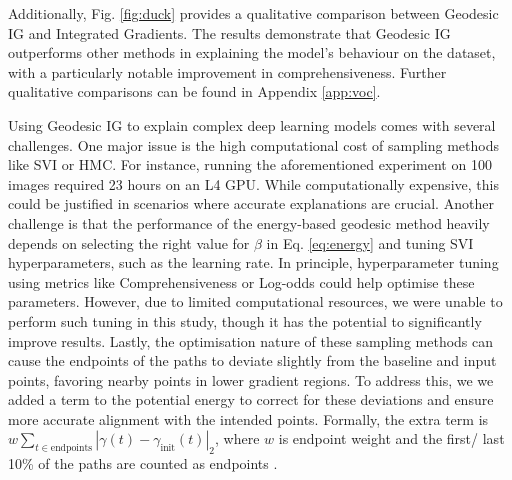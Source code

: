 Additionally, Fig. \ref{fig:duck} provides a qualitative comparison between Geodesic IG and Integrated Gradients. The results demonstrate that Geodesic IG outperforms other methods in explaining the model's behaviour on the dataset, with a particularly notable improvement in comprehensiveness. Further qualitative comparisons can be found in Appendix \ref{app:voc}.

Using Geodesic IG to explain complex deep learning models comes with several challenges. One major issue is the high computational cost of sampling methods like SVI or HMC. For instance, running the aforementioned experiment on 100 images required 23 hours on an L4 GPU. While computationally expensive, this could be justified in scenarios where accurate explanations are crucial. Another challenge is that the performance of the energy-based geodesic method heavily depends on selecting the right value for $\beta$ in Eq. \ref{eq:energy} and tuning SVI hyperparameters, such as the learning rate. In principle, hyperparameter tuning using metrics like Comprehensiveness or Log-odds could help optimise these parameters. However, due to limited computational resources, we were unable to perform such tuning in this study, though it has the potential to significantly improve results. Lastly, the optimisation nature of these sampling methods can cause the endpoints of the paths to deviate slightly from the baseline and input points, favoring nearby points in lower gradient regions. To address this, we we added a term to the potential energy to correct for these deviations and ensure more accurate alignment with the intended points.  Formally, the extra term is $w \sum_{t \in \text{endpoints}} |\gamma(t) - \gamma_{\text{init}}(t)|_2$, where $w$ is endpoint weight and the first/ last 10\% of the paths are counted as endpoints .
